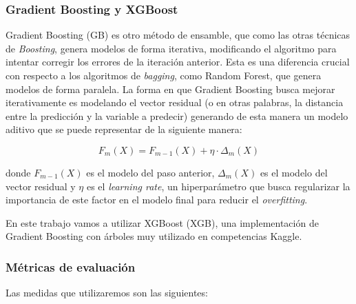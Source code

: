 \subsubsection{Gradient Boosting y XGBoost}

Gradient Boosting (GB) es otro método de ensamble, que como las otras técnicas de \textit{Boosting}, genera modelos de forma iterativa, modificando el algoritmo para intentar corregir los errores de la iteración anterior. Esta es una diferencia crucial con respecto a los algoritmos de \textit{bagging}, como Random Forest, que genera modelos de forma paralela. La forma en que Gradient Boosting busca mejorar iterativamente es modelando el vector residual (o en otras palabras, la distancia entre la predicción y la variable a predecir) generando de esta manera un modelo aditivo que se puede representar de la siguiente manera:

\begin{equation*}
    F_{m}(X) = F_{m - 1}(X) + \eta \cdot \Delta_{m}(X) 
\end{equation*}

donde $F_{m - 1}(X)$ es el modelo del paso anterior, $\Delta_{m}(X)$ es el modelo del vector residual y $\eta$ es el \textit{learning rate}, un hiperparámetro que busca regularizar la importancia de este factor en el modelo final para reducir el \textit{overfitting}. 

En este trabajo vamos a utilizar XGBoost (XGB), una implementación de Gradient Boosting con árboles muy utilizado en competencias Kaggle. 



\subsubsection{Métricas de evaluación}

Las medidas que utilizaremos son las siguientes:

